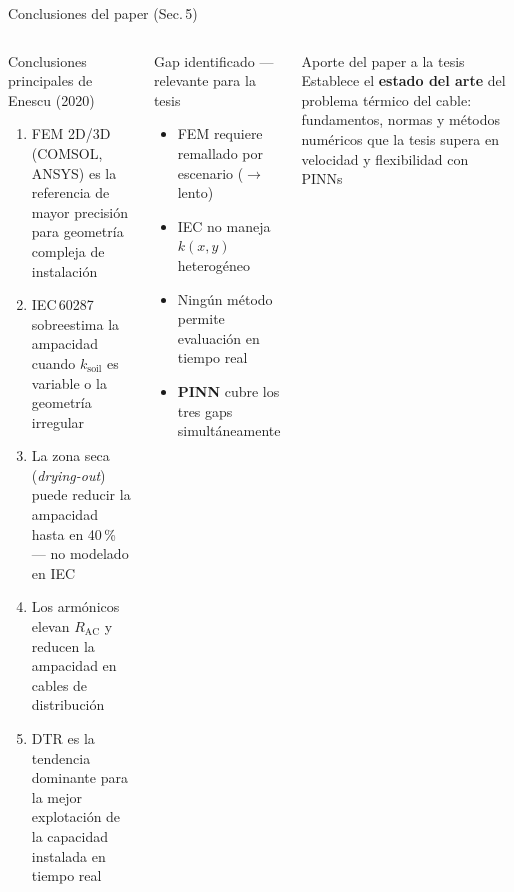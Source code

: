 \documentclass[aspectratio=169]{beamer}
\begin{document}
\begin{frame}{Conclusiones del paper (Sec.\,5)}
  \begin{columns}[T]
      \begin{block}{Conclusiones principales de Enescu (2020)}
        \footnotesize
        \begin{enumerate}
          \item FEM 2D/3D (COMSOL, ANSYS) es la referencia de
                mayor precisión para geometría compleja de instalación
          \item IEC\,60287 sobreestima la ampacidad cuando
                $k_\text{soil}$ es variable o la geometría irregular
          \item La zona seca (\textit{drying-out}) puede reducir
                la ampacidad hasta en 40\,\% --- no modelado en IEC
          \item Los armónicos elevan $R_\text{AC}$ y reducen
                la ampacidad en cables de distribución
          \item DTR es la tendencia dominante para la mejor
                explotación de la capacidad instalada en tiempo real
        \end{enumerate}
      \end{block}
      \begin{alertblock}{Gap identificado --- relevante para la tesis}
        \footnotesize
        \begin{itemize}
          \item FEM requiere remallado por escenario ($\to$ lento)
          \item IEC no maneja $k(x,y)$ heterogéneo
          \item Ningún método permite evaluación en tiempo real
          \item \textbf{PINN} cubre los tres gaps simultáneamente
        \end{itemize}
      \end{alertblock}
      \vspace{0.1em}
      \begin{exampleblock}{Aporte del paper a la tesis}
        \footnotesize
        Establece el \textbf{estado del arte} del problema térmico
        del cable: fundamentos, normas y métodos numéricos
        que la tesis supera en velocidad y flexibilidad con PINNs
      \end{exampleblock}
  \end{columns}
\end{frame}
\end{document}
